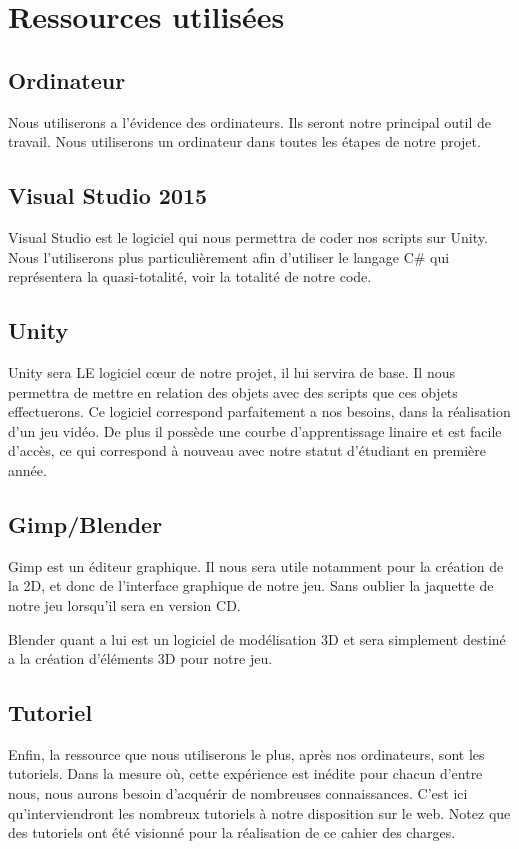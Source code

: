 \documentclass[a4paper, 12pt]{article}
\begin{document}
\section{Ressources utilisées}
	\subsection{Ordinateur}
	Nous utiliserons a l'évidence des ordinateurs. Ils seront notre principal outil de travail. Nous utiliserons un ordinateur dans toutes les étapes de notre projet. 
	\subsection{Visual Studio 2015}
	Visual Studio est le logiciel qui nous permettra de coder nos scripts sur Unity. Nous l'utiliserons plus particulièrement afin d'utiliser le langage C\# qui représentera la quasi-totalité, voir la totalité de notre code.
	\subsection{Unity}
	Unity sera LE logiciel cœur de notre projet, il lui servira de base. Il nous permettra de mettre en relation des objets avec des scripts que ces objets effectuerons. Ce logiciel correspond parfaitement a nos besoins, dans la réalisation d'un jeu vidéo. De plus il possède une courbe d'apprentissage linaire et est facile d'accès, ce qui correspond à nouveau avec notre statut d'étudiant en première année.
	\subsection{Gimp/Blender}
	Gimp est un éditeur graphique. Il nous sera utile notamment pour la création de la 2D, et donc de l'interface graphique de notre jeu. Sans oublier la jaquette de notre jeu lorsqu'il sera en version CD.
	\par Blender quant a lui est un logiciel de modélisation 3D et sera simplement destiné a la création d'éléments 3D pour notre jeu. 
	\subsection{Tutoriel}
	Enfin, la ressource que nous utiliserons le plus, après nos ordinateurs, sont les tutoriels. Dans la mesure où, cette expérience est inédite pour chacun d'entre nous, nous aurons besoin d'acquérir de nombreuses connaissances. C'est ici qu'interviendront les nombreux tutoriels à notre disposition sur le web. Notez que des tutoriels ont été visionné pour la réalisation de ce cahier des charges.
	\newpage
\end{document}
